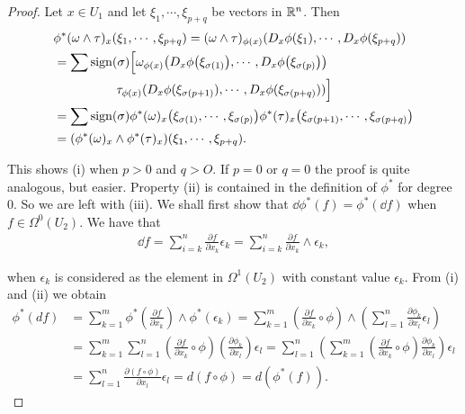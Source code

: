 \begin{proof}
  Let $x\in U_1$ and let $\xi_1, \cdots, \xi_{p+q}$ be vectors in $\mathbb{R}^n$. Then
  \begin{align*}
      & \phi^{*}(\omega\wedge\tau)_{x}(\xi_{1},\cdots,\xi_{p+q})
      = (\omega\wedge\tau)_{\phi(x)}(D_{x}\phi(\xi_{1}),\cdots,D_{x}\phi(\xi_{p+q})) \\
      & = \sum\mathrm{sign}(\sigma)\Big[\omega_{\phi(x)}\big(D_{x}\phi\big(\xi_{\sigma(1)}\big),\cdots,D_{x}\phi\big(\xi_{\sigma(p)}\big)\big) \\
      &\hspace*{5em} \tau_{\phi(x)}(D_x\phi(\xi_{\sigma(p+1)}),\cdots,D_x\phi(\xi_{\sigma(p+q)}))\Big] \\
      & = \sum\mathrm{sign}(\sigma)\phi^{*}(\omega)_{x}\big(\xi_{\sigma(1)},\cdots,\xi_{\sigma(p)}\big)
          \phi^{*}(\tau)_{x}\big(\xi_{\sigma(p+1)},\cdots,\xi_{\sigma(p+q)}\big) \\
      & = (\phi^{*}(\omega)_{x}\wedge\phi^{*}(\tau)_{x})(\xi_{1},\cdots,\xi_{p+q}).
  \end{align*}

  This shows (i) when $p > 0$ and $q > O$. If $p = 0$ or $q = 0$ the proof is quite
analogous, but easier. Property (ii) is contained in the definition of $\phi^*$ for degree
0. So we are left with (iii). We shall first show that $\dd\phi^*(f) = \phi^*(\dd f)$ when
$f\in \Omega^0(U_2)$. We have that
\begin{align*}
  \dd f = \sum_{i=k}^{n}\frac{\partial f}{\partial x_k}\epsilon_k
        = \sum_{i=k}^{n}\frac{\partial f}{\partial x_k}\wedge\epsilon_k,
\end{align*}

when $\epsilon_k$ is considered as the element in $\Omega^1(U_2)$ with constant value $\epsilon_k$. From
(i) and (ii) we obtain
\begin{align*}
    \phi^{*}(df)
    & = \sum_{k=1}^m\phi^*\left(\frac{\partial f}{\partial x_k}\right)\wedge\phi^*(\epsilon_k)
        = \sum_{k=1}^m\left(\frac{\partial f}{\partial x_k}\circ\phi\right)\wedge\left(\sum_{l=1}^n\frac{\partial\phi_k}{\partial x_l}\epsilon_l\right) \\
    & = \sum_{k=1}^m\sum_{l=1}^n\left(\frac{\partial f}{\partial x_k}\circ\phi\right)\left(\frac{\partial\phi_k}{\partial x_l}\right)\epsilon_l
        = \sum_{l=1}^n\left(\sum_{k=1}^m\left(\frac{\partial f}{\partial x_k}\circ\phi\right)\frac{\partial\phi_k}{\partial x_l}\right)\epsilon_l \\
    & = \sum_{l=1}^n\frac{\partial(f\circ\phi)}{\partial x_l}\epsilon_l
        = d(f\circ\phi) = d(\phi^*(f)).
\end{align*}


\end{proof}
